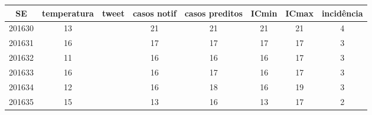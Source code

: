 \begin{tabular}{c|ccccccc}
  \hline
SE & temperatura & tweet & casos notif & casos preditos & ICmin & ICmax & incidência \\ 
  \hline
201630 & 13 &  & 21 & 21 & 21 & 21 & 4 \\ 
  201631 & 16 &  & 17 & 17 & 17 & 17 & 3 \\ 
  201632 & 11 &  & 16 & 16 & 16 & 17 & 3 \\ 
  201633 & 16 &  & 16 & 17 & 16 & 17 & 3 \\ 
  201634 & 12 &  & 16 & 18 & 16 & 19 & 3 \\ 
  201635 & 15 &  & 13 & 16 & 13 & 17 & 2 \\ 
   \hline
\end{tabular}
